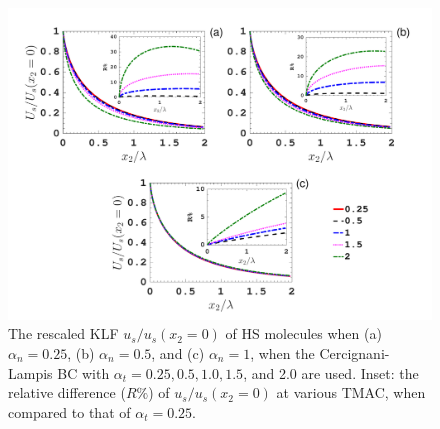 \begin{figure}[t]
	\centering
	\includegraphics[width=1\textwidth]{SlipJump/IMG/check_CL}
	\caption{The rescaled KLF $u_s/u_s(x_2=0)$ of HS molecules when (a) $\alpha_n=0.25$, (b) $\alpha_n=0.5$, and (c) $\alpha_n=1$, when the Cercignani-Lampis BC with $\alpha_t=0.25, 0.5, 1.0, 1.5$, and 2.0 are used. Inset: the relative difference ($R\%$) of $u_s/u_s(x_2=0)$ at various TMAC, when compared to that of $\alpha_t=0.25$.   }
	\label{fig:vel_def_rescale_CL}
\end{figure}








